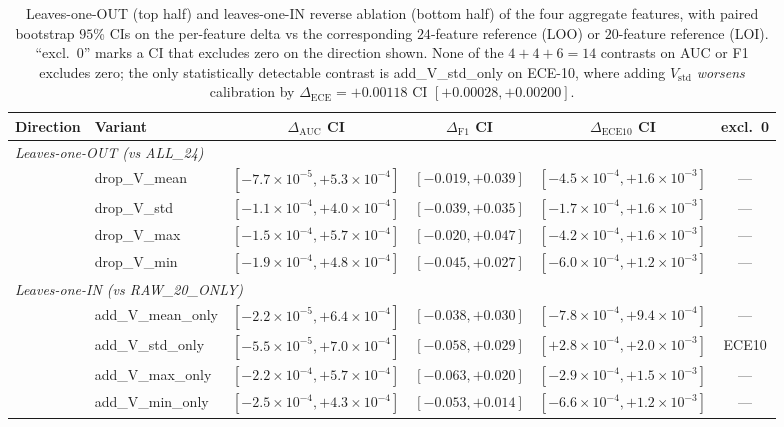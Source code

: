 \begin{table}[t]
\centering
\small
\caption{Leaves-one-OUT (top half) and leaves-one-IN reverse
ablation (bottom half) of the four aggregate features, with paired
bootstrap $95$\% CIs on the per-feature delta vs the
corresponding $24$-feature reference (LOO) or $20$-feature reference
(LOI). ``excl.\ 0'' marks a CI that excludes zero on the direction
shown. None of the $4{+}4{+}6{=}14$ contrasts on AUC or F1
excludes zero; the only statistically detectable contrast is
\textsf{add\_V\_std\_only} on ECE-10, where adding $V_{\text{std}}$
\emph{worsens} calibration by $\Delta_{\text{ECE}}{=}{+}0.00118$
CI $[{+}0.00028, {+}0.00200]$.}
\label{tab:p8-perfeat-abl}
\begin{tabular}{llcccc}
\toprule
Direction & Variant & $\Delta_{\text{AUC}}$ CI & $\Delta_{\text{F1}}$ CI & $\Delta_{\text{ECE10}}$ CI & excl.\ 0 \\
\midrule
\multicolumn{6}{l}{\emph{Leaves-one-OUT (vs ALL\_24)}} \\
& drop\_V\_mean & $[-7.7\!\times\!10^{-5}, +5.3\!\times\!10^{-4}]$ & $[-0.019, +0.039]$ & $[-4.5\!\times\!10^{-4}, +1.6\!\times\!10^{-3}]$ & --- \\
& drop\_V\_std  & $[-1.1\!\times\!10^{-4}, +4.0\!\times\!10^{-4}]$ & $[-0.039, +0.035]$ & $[-1.7\!\times\!10^{-4}, +1.6\!\times\!10^{-3}]$ & --- \\
& drop\_V\_max  & $[-1.5\!\times\!10^{-4}, +5.7\!\times\!10^{-4}]$ & $[-0.020, +0.047]$ & $[-4.2\!\times\!10^{-4}, +1.6\!\times\!10^{-3}]$ & --- \\
& drop\_V\_min  & $[-1.9\!\times\!10^{-4}, +4.8\!\times\!10^{-4}]$ & $[-0.045, +0.027]$ & $[-6.0\!\times\!10^{-4}, +1.2\!\times\!10^{-3}]$ & --- \\
\midrule
\multicolumn{6}{l}{\emph{Leaves-one-IN (vs RAW\_20\_ONLY)}} \\
& add\_V\_mean\_only & $[-2.2\!\times\!10^{-5}, +6.4\!\times\!10^{-4}]$ & $[-0.038, +0.030]$ & $[-7.8\!\times\!10^{-4}, +9.4\!\times\!10^{-4}]$ & --- \\
& add\_V\_std\_only  & $[-5.5\!\times\!10^{-5}, +7.0\!\times\!10^{-4}]$ & $[-0.058, +0.029]$ & $[+2.8\!\times\!10^{-4}, +2.0\!\times\!10^{-3}]$ & ECE10 \\
& add\_V\_max\_only  & $[-2.2\!\times\!10^{-4}, +5.7\!\times\!10^{-4}]$ & $[-0.063, +0.020]$ & $[-2.9\!\times\!10^{-4}, +1.5\!\times\!10^{-3}]$ & --- \\
& add\_V\_min\_only  & $[-2.5\!\times\!10^{-4}, +4.3\!\times\!10^{-4}]$ & $[-0.053, +0.014]$ & $[-6.6\!\times\!10^{-4}, +1.2\!\times\!10^{-3}]$ & --- \\

\end{tabular}
\end{table}
